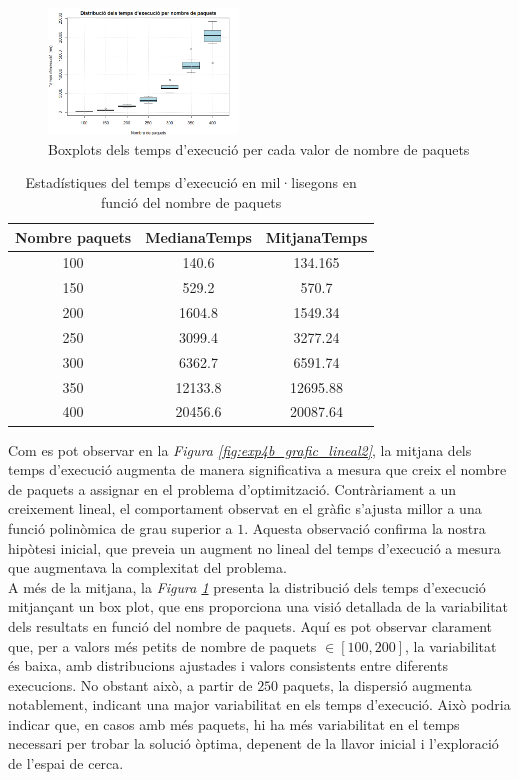 \documentclass[a4paper]{article}
\begin{document}
	\begin{figure}[H]
		\centering
		\includegraphics[width=0.45\textwidth]{images/exp4b_boxplots.png}
		\caption{Boxplots dels temps d'execució per cada valor de nombre de paquets}
		\label{fig:exp4b_boxplots}
	\end{figure}
	
	\begin{table}[H]
		\centering
		\begin{tabular}{|c|c|c|}
			\hline
			\textbf{Nombre paquets} & \textbf{MedianaTemps} & \textbf{MitjanaTemps} \\
			\hline
			100 & 140.6 & 134.165\\
			\hline
			150& 529.2 & 570.7\\
			\hline
			200& 1604.8 & 1549.34\\
			\hline
			250& 3099.4 & 3277.24\\
			\hline
			300& 6362.7 & 6591.74\\
			\hline
			350& 12133.8 & 12695.88\\
			\hline
			400& 20456.6 & 20087.64\\
			\hline
		\end{tabular}
		\caption{Estadístiques del temps d'execució en mil·lisegons en funció del nombre de paquets}
		\label{tab:exp4b_temps}
	\end{table}

	Com es pot observar en la \textit{Figura \ref{fig:exp4b_grafic_lineal2}}, la mitjana dels temps d'execució augmenta de manera significativa a mesura que creix el nombre de paquets a assignar en el problema d'optimització. Contràriament a un creixement lineal, el comportament observat en el gràfic s'ajusta millor a una funció polinòmica de grau superior a $1$. Aquesta observació confirma la nostra hipòtesi inicial, que preveia un augment no lineal del temps d'execució a mesura que augmentava la complexitat del problema. \\
	
	A més de la mitjana, la \textit{Figura \ref{fig:exp4b_boxplots}} presenta la distribució dels temps d'execució mitjançant un box plot, que ens proporciona una visió detallada de la variabilitat dels resultats en funció del nombre de paquets. Aquí es pot observar clarament que, per a valors més petits de nombre de paquets $\in [100, 200]$, la variabilitat és baixa, amb distribucions ajustades i valors consistents entre diferents execucions. No obstant això, a partir de $250$ paquets, la dispersió augmenta notablement, indicant una major variabilitat en els temps d'execució. Això podria indicar que, en casos amb més paquets, hi ha més variabilitat en el temps necessari per trobar la solució òptima, depenent de la llavor inicial i l'exploració de l'espai de cerca. \\
	
\end{document}
